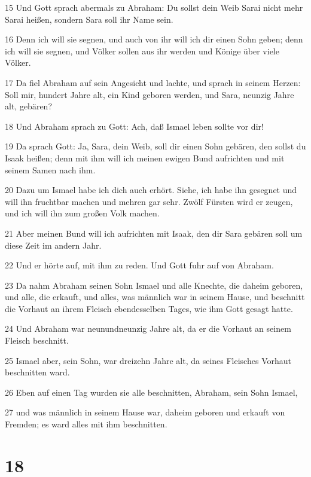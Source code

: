 \par 15 Und Gott sprach abermals zu Abraham: Du sollst dein Weib Sarai nicht mehr Sarai heißen, sondern Sara soll ihr Name sein.
\par 16 Denn ich will sie segnen, und auch von ihr will ich dir einen Sohn geben; denn ich will sie segnen, und Völker sollen aus ihr werden und Könige über viele Völker.
\par 17 Da fiel Abraham auf sein Angesicht und lachte, und sprach in seinem Herzen: Soll mir, hundert Jahre alt, ein Kind geboren werden, und Sara, neunzig Jahre alt, gebären?
\par 18 Und Abraham sprach zu Gott: Ach, daß Ismael leben sollte vor dir!
\par 19 Da sprach Gott: Ja, Sara, dein Weib, soll dir einen Sohn gebären, den sollst du Isaak heißen; denn mit ihm will ich meinen ewigen Bund aufrichten und mit seinem Samen nach ihm.
\par 20 Dazu um Ismael habe ich dich auch erhört. Siehe, ich habe ihn gesegnet und will ihn fruchtbar machen und mehren gar sehr. Zwölf Fürsten wird er zeugen, und ich will ihn zum großen Volk machen.
\par 21 Aber meinen Bund will ich aufrichten mit Isaak, den dir Sara gebären soll um diese Zeit im andern Jahr.
\par 22 Und er hörte auf, mit ihm zu reden. Und Gott fuhr auf von Abraham.
\par 23 Da nahm Abraham seinen Sohn Ismael und alle Knechte, die daheim geboren, und alle, die erkauft, und alles, was männlich war in seinem Hause, und beschnitt die Vorhaut an ihrem Fleisch ebendesselben Tages, wie ihm Gott gesagt hatte.
\par 24 Und Abraham war neunundneunzig Jahre alt, da er die Vorhaut an seinem Fleisch beschnitt.
\par 25 Ismael aber, sein Sohn, war dreizehn Jahre alt, da seines Fleisches Vorhaut beschnitten ward.
\par 26 Eben auf einen Tag wurden sie alle beschnitten, Abraham, sein Sohn Ismael,
\par 27 und was männlich in seinem Hause war, daheim geboren und erkauft von Fremden; es ward alles mit ihm beschnitten.

\chapter{18}

